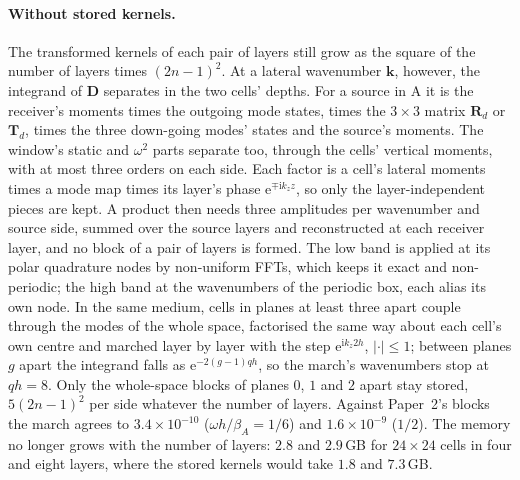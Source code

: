 \documentclass[11pt,a4paper]{article}
\newcommand{\bk}{\mathbf{k}}
\newcommand{\ii}{\mathrm{i}}
\newcommand{\ee}{\mathrm{e}}
\begin{document}
\paragraph{Without stored kernels.} The transformed kernels of each pair of layers still grow as the square of the
number of layers times $(2n-1)^2$. At a lateral wavenumber $\bk$, however, the integrand of $\mathbf D$ separates
in the two cells' depths. For a source in A it is the receiver's moments times the outgoing mode states, times the
$3\times3$ matrix $\mathbf R_d$ or $\mathbf T_d$, times the three down-going modes' states and the source's
moments. The window's static and $\omega^2$ parts separate too, through the cells' vertical moments, with at
most three orders on each side. Each factor is a cell's lateral moments times a mode map times its layer's phase
$\ee^{\mp\ii k_zz}$, so only the layer-independent pieces are kept. A product then needs three amplitudes per
wavenumber and source side, summed over the source layers and reconstructed at each receiver layer, and no block
of a pair of layers is formed. The low band is applied at its polar quadrature nodes by non-uniform FFTs, which
keeps it exact and non-periodic; the high band at the wavenumbers of the periodic box, each alias its own node. In
the same medium, cells in planes at least three apart couple through the modes of the whole space, factorised the
same way about each cell's own centre and marched layer by layer with the step $\ee^{\ii k_z2h}$, $|\cdot|\le1$;
between planes $g$ apart the integrand falls as $\ee^{-2(g-1)qh}$, so the march's wavenumbers stop at $qh=8$.
Only the whole-space blocks of planes $0$, $1$ and $2$ apart stay stored, $5(2n-1)^2$ per side whatever the
number of layers. Against Paper~2's blocks the march agrees to $3.4\times10^{-10}$ ($\omega h/\beta_A=1/6$) and
$1.6\times10^{-9}$ ($1/2$). The memory no longer grows with the number of layers: $2.8$ and $2.9$\,GB for
$24\times24$ cells in four and eight layers, where the stored kernels would take $1.8$ and $7.3$\,GB.
\end{document}
